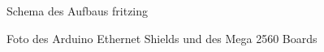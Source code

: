\begin{figure}
  \centering
  \caption{Schema des Aufbaus fritzing}
  \label{fritzing}
\end{figure}

\begin{figure}
  \centering
  \caption{Foto des Arduino Ethernet Shields und des Mega 2560 Boards}
  \label{foto1}
\end{figure}